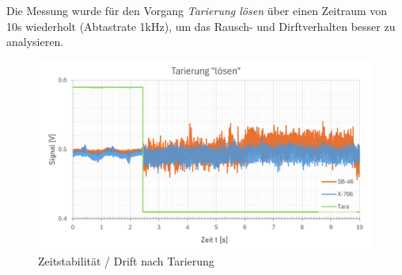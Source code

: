 \documentclass[12pt,a4paper]{article}
\begin{document}
	Die Messung wurde für den Vorgang \textit{Tarierung lösen} über einen Zeitraum von 10s wiederholt (Abtastrate 1kHz), um das Rausch- und Dirftverhalten besser zu analysieren. 
	\begin{figure}[H]
		\centering
		\includegraphics[width=1\linewidth]{Imgs/Tara_loesen}
		\caption{Zeitstabilität / Drift nach Tarierung}
		\label{fig:taraloesen}
	\end{figure}
\end{document}
